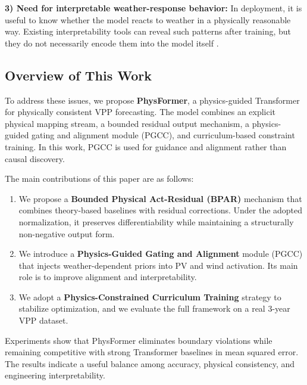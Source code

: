 \textbf{3) Need for interpretable weather-response behavior:} In deployment, it is useful to know whether the model reacts to weather in a physically reasonable way. Existing interpretability tools can reveal such patterns after training, but they do not necessarily encode them into the model itself \cite{Vle2025,Lovo2025,Arabzadeh2025}.

\subsection{Overview of This Work}
To address these issues, we propose \textbf{PhysFormer}, a physics-guided Transformer for physically consistent VPP forecasting. The model combines an explicit physical mapping stream, a bounded residual output mechanism, a physics-guided gating and alignment module (PGCC), and curriculum-based constraint training. In this work, PGCC is used for guidance and alignment rather than causal discovery.

The main contributions of this paper are as follows:

\begin{enumerate}
    \item We propose a \textbf{Bounded Physical Act-Residual (BPAR)} mechanism that combines theory-based baselines with residual corrections. Under the adopted normalization, it preserves differentiability while maintaining a structurally non-negative output form.

    \item We introduce a \textbf{Physics-Guided Gating and Alignment} module (PGCC) that injects weather-dependent priors into PV and wind activation. Its main role is to improve alignment and interpretability.

    \item We adopt a \textbf{Physics-Constrained Curriculum Training} strategy to stabilize optimization, and we evaluate the full framework on a real 3-year VPP dataset.
\end{enumerate}

Experiments show that PhysFormer eliminates boundary violations while remaining competitive with strong Transformer baselines in mean squared error. The results indicate a useful balance among accuracy, physical consistency, and engineering interpretability.


